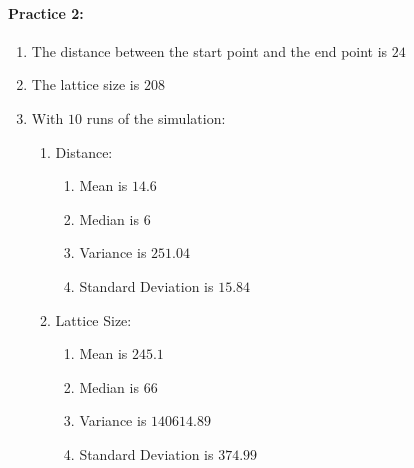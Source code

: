 \documentclass[12pt]{article}
\begin{document}
\paragraph{Practice 2:}
	\begin{enumerate}
    \item The distance between the start point and the end point is $24$
	\item The lattice size is $208$
    \item With $10$ runs of the simulation:
    	\begin{enumerate}
    	\item Distance:
        	\begin{enumerate}
        	\item Mean is $14.6$
            \item Median is $6$
            \item Variance is $251.04$
            \item Standard Deviation is $15.84$
        	\end{enumerate}
       	\item Lattice Size:
        	\begin{enumerate}
        	\item Mean is $245.1$
            \item Median is $66$
            \item Variance is $140614.89$
            \item Standard Deviation is $374.99$
        	\end{enumerate}
    	\end{enumerate}

\pagebreak


\end{enumerate}
\end{document}
